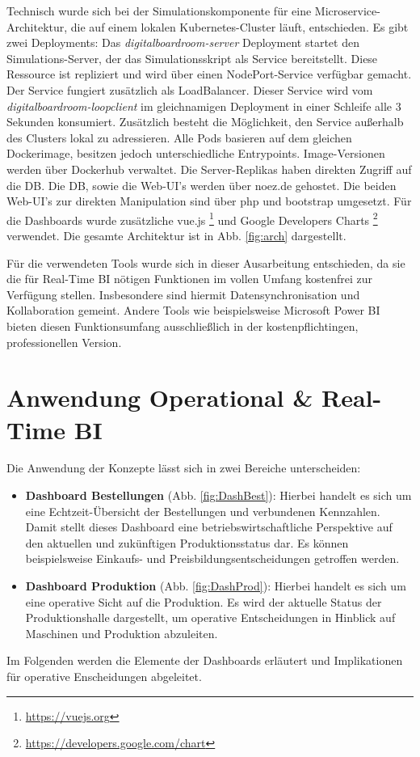 Technisch wurde sich bei der Simulationskomponente für eine Microservice-Architektur, die auf einem lokalen Kubernetes-Cluster läuft, entschieden. Es gibt zwei Deployments: Das \textit{digitalboardroom-server} Deployment startet den Simulations-Server, der das Simulationsskript als Service bereitstellt. Diese Ressource ist repliziert und wird über einen NodePort-Service verfügbar gemacht. Der Service fungiert zusätzlich als LoadBalancer. Dieser Service wird vom \textit{digitalboardroom-loopclient} im gleichnamigen Deployment in einer Schleife alle 3 Sekunden konsumiert. Zusätzlich besteht die Möglichkeit, den Service außerhalb des Clusters lokal zu adressieren. Alle Pods basieren auf dem gleichen Dockerimage, besitzen jedoch unterschiedliche Entrypoints. Image-Versionen werden über Dockerhub verwaltet. Die Server-Replikas haben direkten Zugriff auf die \ac{DB}.
Die \ac{DB}, sowie die Web-UI's werden über noez.de gehostet. Die beiden Web-UI's zur direkten Manipulation sind über php und bootstrap umgesetzt. Für die Dashboards wurde zusätzliche vue.js \footnote{\url{https://vuejs.org}} und Google Developers Charts \footnote{\url{https://developers.google.com/chart}} verwendet. Die gesamte Architektur ist in Abb. \ref{fig:arch} dargestellt.

Für die verwendeten Tools wurde sich in dieser Ausarbeitung entschieden, da sie die für Real-Time \ac{BI} nötigen Funktionen im vollen Umfang kostenfrei zur Verfügung stellen. Insbesondere sind hiermit Datensynchronisation und Kollaboration gemeint. Andere Tools wie beispielsweise Microsoft Power BI bieten diesen Funktionsumfang ausschließlich in der kostenpflichtingen, professionellen Version.

\section{Anwendung Operational \& Real-Time BI} \label{abs:anwOP}
Die Anwendung der Konzepte lässt sich in zwei Bereiche unterscheiden:
\begin{itemize}
    \item \textbf{Dashboard Bestellungen} (Abb. \ref{fig:DashBest}): Hierbei handelt es sich um eine Echtzeit-Übersicht der Bestellungen und verbundenen Kennzahlen. Damit stellt dieses Dashboard eine betriebswirtschaftliche Perspektive auf den aktuellen und zukünftigen Produktionsstatus dar. Es können beispielsweise Einkaufs- und Preisbildungsentscheidungen getroffen werden.
    \item \textbf{Dashboard Produktion} (Abb. \ref{fig:DashProd}): Hierbei handelt es sich um eine operative Sicht auf die Produktion. Es wird der aktuelle Status der Produktionshalle dargestellt, um operative Entscheidungen in Hinblick auf Maschinen und Produktion abzuleiten.
\end{itemize}
Im Folgenden werden die Elemente der Dashboards erläutert und Implikationen für operative Enscheidungen abgeleitet.
